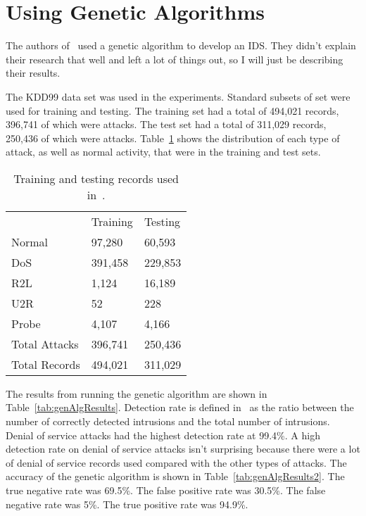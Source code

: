 \documentclass{sig-alternate}
\begin{document}
\section{Using Genetic Algorithms}
\label{sec:genAlgImp}

The authors of~\cite{DBLP:journals/corr/abs-1204-1336} used a genetic algorithm to develop an IDS. They didn't explain their research that well and left a lot of things out, so I will just be describing their results.

The KDD99 data set was used in the experiments. Standard subsets of set were used for training and testing. The training set had a total of 494,021 records, 396,741 of which were attacks. The test set had a total of 311,029 records, 250,436 of which were attacks. Table~\ref{tab:numberOfRecords} shows the distribution of each type of attack, as well as normal activity, that were in the training and test sets.

\begin{table}
\center
\caption{Training and testing records used in~\cite{DBLP:journals/corr/abs-1204-1336}.}
\vspace{0.20cm}
\begin{tabular}{lll}
  & Training & Testing \\ 
Normal & 97,280 & 60,593\\ \hline
DoS	   & 391,458 & 229,853\\
R2L    & 1,124   & 16,189\\
U2R    & 52      & 228\\
Probe  & 4,107  & 4,166\\ \hline
Total Attacks & 396,741 & 250,436 \\
Total Records  & 494,021 & 311,029\\
\end{tabular}
\center
\label{tab:numberOfRecords}
\end{table}



The results from running the genetic algorithm are shown in Table~\ref{tab:genAlgResults}. Detection rate is defined in~\cite{DBLP:journals/corr/abs-1204-1336} as the ratio between the number of correctly detected intrusions and the total number of intrusions. Denial of service attacks had the highest detection rate at 99.4\%. A high detection rate on denial of service attacks isn't surprising because there were a lot of denial of service records used compared with the other types of attacks. The accuracy of the genetic algorithm is shown in Table~\ref{tab:genAlgResults2}. The true negative rate was 69.5\%. The false positive rate was 30.5\%. The false negative rate was 5\%. The true positive rate was 94.9\%.
\end{document}
